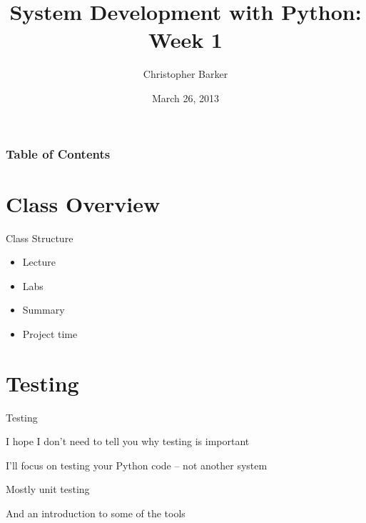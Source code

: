 \documentclass{beamer}
\title[Python Certificate: System Development]{System Development with Python: Week 1}
\author{Christopher Barker}
\institute{UW Continuing Education}
\date{March 26, 2013}
\begin{document}
\begin{frame}
  \titlepage
\end{frame}

\begin{frame}
\frametitle{Table of Contents}
  \tableofcontents
\end{frame}


\section{Class Overview}

\begin{frame}[fragile]{Class Structure}

{\Large
\vfill
\begin{itemize}
  \item Lecture
  \item Labs
  \item Summary
  \item Project time
\end{itemize}
}

\vfill

\end{frame}


\section{Testing}


\begin{frame}[fragile]{Testing}

\vfill
{\Large I hope I don't need to tell you why testing is important}

\vfill
{\Large I'll focus on testing your Python code -- not another system}

\vfill
{\Large Mostly unit testing}

\vfill
{\Large And an introduction to some of the tools}

\vfill

\end{frame} 
\end{document}
